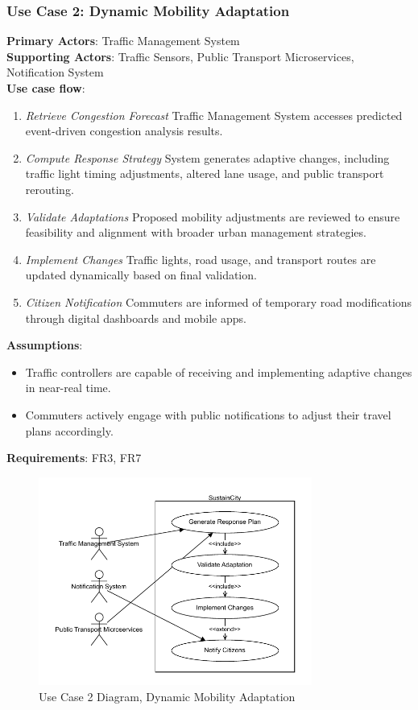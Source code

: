 \documentclass[a4paper,12pt]{article}
\begin{document}
\subsubsection*{Use Case 2: Dynamic Mobility Adaptation}
\textbf{Primary Actors}: Traffic Management System \\
\textbf{Supporting Actors}: Traffic Sensors, Public Transport Microservices, Notification System \\
\textbf{Use case flow}: 
\begin{enumerate}
    \item \textit{Retrieve Congestion Forecast} Traffic Management System accesses predicted event-driven congestion analysis results.
    \item \textit{Compute Response Strategy} System generates adaptive changes, including traffic light timing adjustments, altered lane usage, and public transport rerouting.
    \item \textit{Validate Adaptations} Proposed mobility adjustments are reviewed to ensure feasibility and alignment with broader urban management strategies.
    \item \textit{Implement Changes} Traffic lights, road usage, and transport routes are updated dynamically based on final validation.
    \item \textit{Citizen Notification} Commuters are informed of temporary road modifications through digital dashboards and mobile apps.
\end{enumerate}
\textbf{Assumptions}: 
\begin{itemize}
    \item Traffic controllers are capable of receiving and implementing adaptive changes in near-real time.
    \item Commuters actively engage with public notifications to adjust their travel plans accordingly.
\end{itemize}
\textbf{Requirements}: FR3, FR7
\\
\begin{figure}[h]
    \centering
    \includegraphics[width=0.8\textwidth]{diagrams/Dynamic_Mobility_Adaptation.drawio.pdf}
    \caption{Use Case 2 Diagram, Dynamic Mobility Adaptation}
    \label{fig:Dynamic_Mobility_Adaptation.drawio}
\end{figure}
\\
\end{document}
